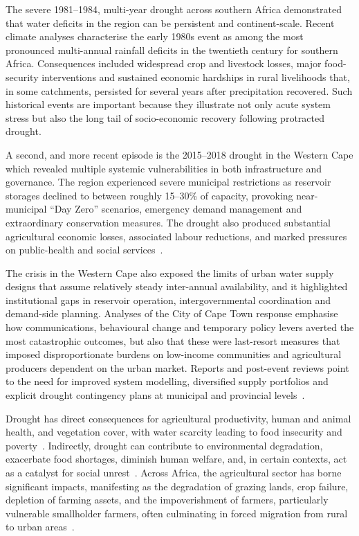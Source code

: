 The severe 1981–1984, multi-year drought across southern Africa demonstrated that water deficits in the region can be persistent and continent-scale. Recent climate analyses characterise the early 1980s event as among the most pronounced multi-annual rainfall deficits in the twentieth century for southern Africa. Consequences included widespread crop and livestock losses, major food-security interventions and sustained economic hardships in rural livelihoods that, in some catchments, persisted for several years after precipitation recovered. Such historical events are important because they illustrate not only acute system stress but also the long tail of socio-economic recovery following protracted drought.

A second, and more recent episode is the 2015–2018 drought in the Western Cape which revealed multiple systemic vulnerabilities in both infrastructure and governance. The region experienced severe municipal restrictions as reservoir storages declined to between roughly 15–30\% of capacity, provoking near-municipal “Day Zero” scenarios, emergency demand management and extraordinary conservation measures. The drought also produced substantial agricultural economic losses, associated labour reductions, and marked pressures on public-health and social services~\cite{socioeconomic_effects,drivers_of_drought_som,Sousa_2018}. 

The crisis in the Western Cape also exposed the limits of urban water supply designs that assume relatively steady inter-annual availability, and it highlighted institutional gaps in reservoir operation, intergovernmental coordination and demand-side planning. Analyses of the City of Cape Town response emphasise how communications, behavioural change and temporary policy levers averted the most catastrophic outcomes, but also that these were last-resort measures that imposed disproportionate burdens on low-income communities and agricultural producers dependent on the urban market. Reports and post-event reviews point to the need for improved system modelling, diversified supply portfolios and explicit drought contingency plans at municipal and provincial levels~\cite{Joubert_Ziervogel_2019,Babajide}.

Drought has direct consequences for agricultural productivity, human and animal health, and vegetation cover, with water scarcity leading to food insecurity and poverty~\cite{SHIFERAW201467}. Indirectly, drought can contribute to environmental degradation, exacerbate food shortages, diminish human welfare, and, in certain contexts, act as a catalyst for social unrest~\cite{https://doi.org/10.1155/2014/508953}. Across Africa, the agricultural sector has borne significant impacts, manifesting as the degradation of grazing lands, crop failure, depletion of farming assets, and the impoverishment of farmers, particularly vulnerable smallholder farmers, often culminating in forced migration from rural to urban areas~\cite{SHIFERAW201467}. 

